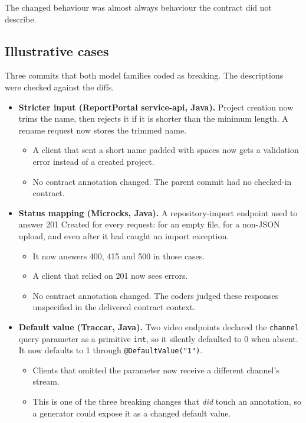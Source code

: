 \documentclass[conference]{IEEEtran}
\begin{document}
The changed behaviour was almost always behaviour the contract did not describe.

\subsection{Illustrative cases}
Three commits that both model families coded as breaking. The descriptions were checked against the diffs.
\begin{itemize}
\item \textbf{Stricter input (ReportPortal service-api, Java).} Project creation now trims the name, then rejects it if it is shorter than the minimum length. A rename request now stores the trimmed name.
\begin{itemize}
\item A client that sent a short name padded with spaces now gets a validation error instead of a created project.
\item No contract annotation changed. The parent commit had no checked-in contract.
\end{itemize}
\item \textbf{Status mapping (Microcks, Java).} A repository-import endpoint used to answer 201 Created for every request: for an empty file, for a non-JSON upload, and even after it had caught an import exception.
\begin{itemize}
\item It now answers 400, 415 and 500 in those cases.
\item A client that relied on 201 now sees errors.
\item No contract annotation changed. The coders judged these responses unspecified in the delivered contract context.
\end{itemize}
\item \textbf{Default value (Traccar, Java).} Two video endpoints declared the \texttt{channel} query parameter as a primitive \texttt{int}, so it silently defaulted to 0 when absent. It now defaults to 1 through \texttt{@DefaultValue("1")}.
\begin{itemize}
\item Clients that omitted the parameter now receive a different channel's stream.
\item This is one of the three breaking changes that \emph{did} touch an annotation, so a generator could expose it as a changed default value.
\end{itemize}
\end{itemize}
\end{document}
